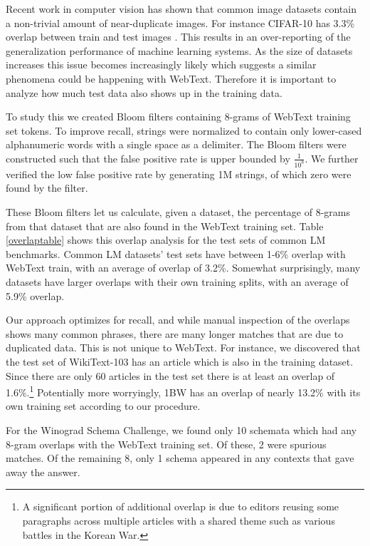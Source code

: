 \documentclass{article}
\begin{document}
Recent work in computer vision has shown that common image datasets contain a non-trivial amount of near-duplicate images. For instance CIFAR-10 has 3.3\% overlap between train and test images \cite{barz2019purging}. This results in an over-reporting of the generalization performance of machine learning systems. As the size of datasets increases this issue becomes increasingly likely which suggests a similar phenomena could be happening with WebText. Therefore it is important to analyze how much test data also shows up in the training data.

To study this we created Bloom filters containing 8-grams of WebText training set tokens. To improve recall, strings were normalized to contain only lower-cased alphanumeric words with a single space as a delimiter. The Bloom filters were constructed such that the false positive rate is upper bounded by $\frac{1}{10^{8}}$. We further verified the low false positive rate by generating 1M strings, of which zero were found by the filter.

These Bloom filters let us calculate, given a dataset, the percentage of 8-grams from that dataset that are also found in the WebText training set.  Table \ref{overlaptable} shows this overlap analysis for the test sets of common LM benchmarks.  Common LM datasets' test sets have between 1-6\% overlap with WebText train, with an average of overlap of 3.2\%. Somewhat surprisingly, many datasets have larger overlaps with their own training splits, with an average of 5.9\% overlap.

Our approach optimizes for recall, and while manual inspection of the overlaps shows many common phrases, there are many longer matches that are due to duplicated data. This is not unique to WebText. For instance, we discovered that the test set of WikiText-103 has an article which is also in the training dataset. Since there are only 60 articles in the test set there is at least an overlap of 1.6\%.\footnote{A significant portion of additional overlap is due to editors reusing some paragraphs across multiple articles with a shared theme such as various battles in the Korean War.} Potentially more worryingly, 1BW has an overlap of nearly 13.2\% with its own training set according to our procedure.

For the Winograd Schema Challenge, we found only 10 schemata which had any 8-gram overlaps with the WebText training set. Of these, 2 were spurious matches.  Of the remaining 8, only 1 schema appeared in any contexts that gave away the answer.
\end{document}
